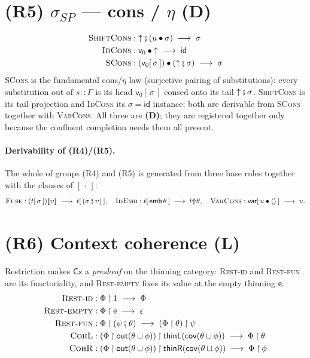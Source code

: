 \documentclass{article}
\newcommand{\oi}{\mathsf{1}}                        %
\renewcommand{\oe}{\mathsf{e}}                      %
\newcommand{\comp}{\mathbin{\fatsemi}}              %
\newcommand{\thL}{\mathsf{thinL}}
\newcommand{\thR}{\mathsf{thinR}}
\newcommand{\cop}{\mathbin{\sqcup}}                 %
\newcommand{\out}{\mathsf{out}}
\newcommand{\cov}{\mathsf{cov}}
\newcommand{\wt}[2]{#1 {\Uparrow} #2}              %
\newcommand{\ids}{\mathsf{id}}
\newcommand{\shift}{\mathord{\uparrow}}             %
\newcommand{\nil}{\langle\rangle}                   %
\newcommand{\emb}{\mathsf{emb}}
\newcommand{\ins}[1]{[\,#1\,]}                      %
\newcommand{\app}[2]{#1\llbracket#2\rrbracket}      %
\newcommand{\seq}{\mathbin{{\fatsemi}}}             %
\newcommand{\cons}{\mathbin{\bullet}}               %
\newcommand{\vz}{\mathsf{v}_0}                      %
\newcommand{\Cx}{\mathsf{Cx}}
\newcommand{\rest}{\mathbin{{\restriction}}}        %
\newcommand{\eps}{\varepsilon}
\newcommand{\rw}{\;\longrightarrow\;}              %
\newcommand{\catL}{\textbf{(L)}}
\newcommand{\catD}{\textbf{(D)}}
\theoremstyle{plain}
\begin{document}
\section{(R5) $\sigma_{SP}$ --- cons / $\eta$ \hfill \catD}\label{r:cons}
\begin{align}
  \textsc{ShiftCons} &: \shift\seq(u\cons\sigma) \rw \sigma \label{r:shiftCons}\\
  \textsc{IdCons} &: \vz\cons\shift \rw \ids \label{r:idCons}\\
  \textsc{SCons} &: (\vz\ins\sigma)\cons(\shift\seq\sigma) \rw \sigma \label{r:sCons}
\end{align}
\noindent
\textsc{SCons} is the fundamental cons/$\eta$ law (surjective pairing of substitutions):
every substitution out of $s\!::\!\Gamma$ is its head $\vz\ins\sigma$ consed onto its tail
$\shift\seq\sigma$.
\textsc{ShiftCons} is its tail projection and \textsc{IdCons} its $\sigma=\ids$ instance;
both are derivable from \textsc{SCons} together with \textsc{VarCons}.
All three are \catD; they are registered together only because the confluent completion
needs them all present.

\paragraph{Derivability of (R4)/(R5).}
The whole of groups (R4) and (R5) is generated from three base rules together with
the clauses of $\ins\cdot$:
\[
  \textsc{Fuse}:\app{(t\ins\sigma)}{\upsilon}\rw t\ins{(\sigma\seq\upsilon)},
  \quad
  \textsc{IdEmb}:t\ins{\emb\,\theta}\rw\wt{t}{\theta},
  \quad
  \textsc{VarCons}:\mathsf{var}\ins{u\cons\nil}\rw u.
\]

\section{(R6) Context coherence \hfill \catL}\label{r:cx}

\noindent
Restriction makes $\Cx$ a \emph{presheaf} on the thinning category:
\textsc{Rest-id} and \textsc{Rest-fun} are its functoriality,
and \textsc{Rest-empty} fixes its value at the empty thinning $\oe$.
\begin{align}
  \textsc{Rest-id} &: \Phi\rest\oi \rw \Phi \label{r:restId}\\
  \textsc{Rest-empty} &: \Phi\rest\oe \rw \eps \label{r:restEmpty}\\
  \textsc{Rest-fun} &: \Phi\rest(\psi\comp\theta) \rw (\Phi\rest\theta)\rest\psi \label{r:restFun}\\
  \textsc{CohL} &: (\Phi\rest\out(\theta\cop\phi))\rest\thL(\cov(\theta\cop\phi)) \rw \Phi\rest\theta \label{r:cohL}\\
  \textsc{CohR} &: (\Phi\rest\out(\theta\cop\phi))\rest\thR(\cov(\theta\cop\phi)) \rw \Phi\rest\phi \label{r:cohR}
\end{align}
\end{document}

